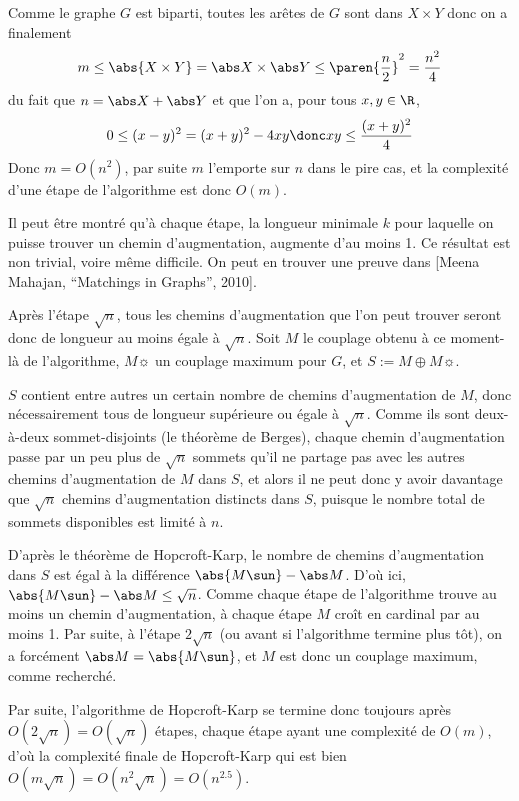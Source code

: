  Comme le graphe $G$ est biparti, toutes les arêtes de $G$ sont dans $X \times Y$ donc on a finalement
 \[ m \leq \abs {X \times  Y} = \abs X \times \abs Y \leq \paren{\dfrac n 2}^2 = \dfrac {n^2} 4 \]
 du fait que $n = \abs X + \abs Y$ et que l'on a, pour tous $x,y \in \R$,
 \[0 \leq (x - y)^2  = (x + y)^2 - 4xy \donc xy \leq \frac{(x + y)^2}{4} \]
 Donc $m = O(n^2)$, par suite $m$ l'emporte sur $n$ dans le pire cas, et la complexité d'une étape de l'algorithme est donc $O(m)$.
 
 Il peut être montré qu'à chaque étape, la longueur minimale $k$ pour laquelle on puisse trouver un chemin d'augmentation, augmente d'au moins 1. Ce résultat est non trivial, voire même difficile. On peut en trouver une preuve dans [Meena Mahajan, ``Matchings in Graphs'', 2010].
 
 Après l'étape $\sqrt n$, tous les chemins d'augmentation que l'on peut trouver seront donc de longueur au moins égale à $\sqrt n$. Soit $M$ le couplage obtenu à ce moment-là de l'algorithme, $M\sun$ un couplage maximum pour $G$, et $S := M \oplus M\sun$.
 
 $S$ contient entre autres un certain nombre de chemins d'augmentation de $M$, donc nécessairement tous de longueur supérieure ou égale à $\sqrt n$. Comme ils sont deux-à-deux sommet-disjoints (\cf le théorème de Berges), chaque chemin d'augmentation passe par un peu plus de $\sqrt n$ sommets qu'il ne partage pas avec les autres chemins d'augmentation de $M$ dans $S$, et alors il ne peut donc y avoir davantage que $\sqrt n$ chemins d'augmentation distincts dans $S$, puisque le nombre total de sommets disponibles est limité à $n$.
 
 D'après le théorème de Hopcroft-Karp, le nombre de chemins d'augmentation dans $S$ est égal à la différence $\abs {M\sun} - \abs M$. D'où ici, $\abs {M\sun} - \abs M \leq \sqrt n$. Comme chaque étape de l'algorithme trouve au moins un chemin d'augmentation, à chaque étape $M$ croît en cardinal par au moins 1. Par suite, à l'étape $2 \sqrt n$ (ou avant si l'algorithme termine plus tôt), on a forcément $\abs M = \abs {M\sun}$, et $M$ est donc un couplage maximum, comme recherché.
 
 Par suite, l'algorithme de Hopcroft-Karp se termine donc toujours après $O(2\sqrt n) = O(\sqrt n)$ étapes, chaque étape ayant une complexité de $O(m)$, d'où la complexité finale de Hopcroft-Karp qui est bien $O(m \sqrt n) = O(n^2 \sqrt n) = O(n^{2.5})$.
 

